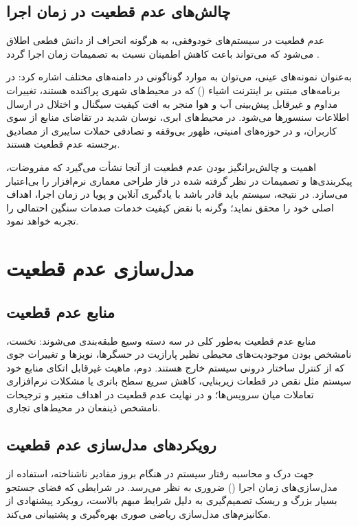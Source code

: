 \documentclass[oneside,openany,phd]{TMU-Thesis}
\begin{document}
\subsection{چالش‌های عدم قطعیت در زمان اجرا}

عدم قطعیت در سیستم‌های خودوفقی، به هرگونه انحراف از دانش قطعی اطلاق می‌شود که می‌تواند باعث کاهش اطمینان نسبت به تصمیمات زمان اجرا گردد \cite{RS_DRL_Article}. 

به‌عنوان نمونه‌های عینی، می‌توان به موارد گوناگونی در دامنه‌های مختلف اشاره کرد: در برنامه‌های مبتنی بر اینترنت اشیاء () که در محیط‌های شهری پراکنده هستند، تغییرات مداوم و غیرقابل پیش‌بینی آب و هوا منجر به افت کیفیت سیگنال و اختلال در ارسال اطلاعات سنسورها می‌شود. در محیط‌های ابری، نوسان شدید در تقاضای منابع از سوی کاربران، و در حوزه‌های امنیتی، ظهور بی‌وقفه و تصادفی حملات سایبری از مصادیق برجسته عدم قطعیت هستند.

اهمیت و چالش‌برانگیز بودن عدم قطعیت از آنجا نشأت می‌گیرد که مفروضات، پیکربندی‌ها و تصمیمات در نظر گرفته شده در فاز طراحی معماری نرم‌افزار را بی‌اعتبار می‌سازد. در نتیجه، سیستم باید قادر باشد با یادگیری آنلاین و پویا در زمان اجرا، اهداف اصلی خود را محقق نماید؛ وگرنه با نقض کیفیت خدمات صدمات سنگین احتمالی را تجربه خواهد نمود.

\section{مدل‌سازی عدم قطعیت}
\subsection{منابع عدم قطعیت}

منابع عدم قطعیت به‌طور کلی در سه دسته وسیع طبقه‌بندی می‌شوند: نخست، نامشخص بودن موجودیت‌های محیطی نظیر پارازیت در حسگرها، نویزها و تغییرات جوی که از کنترل ساختار درونی سیستم خارج هستند. دوم، ماهیت غیرقابل اتکای منابع خود سیستم مثل نقص در قطعات زیربنایی، کاهش سریع سطح باتری یا مشکلات نرم‌افزاری تعاملات میان سرویس‌ها؛ و در نهایت عدم قطعیت در اهداف متغیر و ترجیحات نامشخص ذینفعان در محیط‌های تجاری.

\subsection{رویکردهای مدل‌سازی عدم قطعیت}

جهت درک و محاسبه رفتار سیستم در هنگام بروز مقادیر ناشناخته، استفاده از مدل‌سازی‌های زمان اجرا () ضروری به نظر می‌رسد. در شرایطی که فضای جستجو بسیار بزرگ و ریسک تصمیم‌گیری به دلیل شرایط مبهم بالاست، رویکرد پیشنهادی از مکانیزم‌های مدل‌سازی ریاضی صوری بهره‌گیری و پشتیبانی می‌کند.
\end{document}
